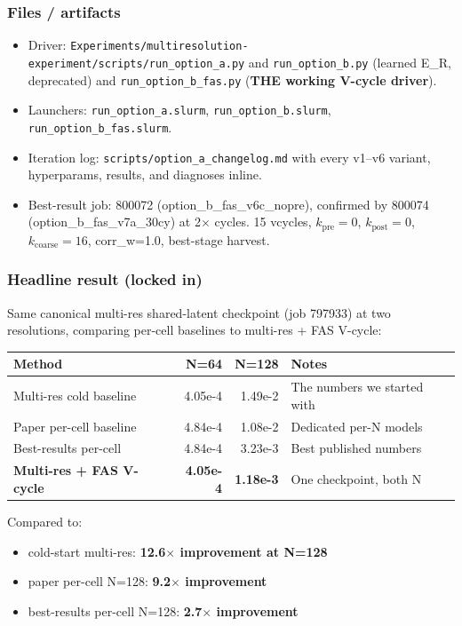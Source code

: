 \subsubsection*{Files / artifacts}
\begin{itemize}
  \item Driver: \texttt{Experiments/multiresolution-experiment/scripts/run\_option\_a.py}
        and \texttt{run\_option\_b.py} (learned E\_R, deprecated) and
        \texttt{run\_option\_b\_fas.py} (\textbf{THE working V-cycle driver}).
  \item Launchers: \texttt{run\_option\_a.slurm},
        \texttt{run\_option\_b.slurm}, \texttt{run\_option\_b\_fas.slurm}.
  \item Iteration log: \texttt{scripts/option\_a\_changelog.md} with every
        v1--v6 variant, hyperparams, results, and diagnoses inline.
  \item Best-result job: 800072 (option\_b\_fas\_v6c\_nopre), confirmed
        by 800074 (option\_b\_fas\_v7a\_30cy) at 2$\times$ cycles.
        15 vcycles, $k_{\text{pre}}=0$, $k_{\text{post}}=0$,
        $k_{\text{coarse}}=16$, corr\_w=1.0, best-stage harvest.
\end{itemize}

\subsubsection*{Headline result (locked in)}

Same canonical multi-res shared-latent checkpoint (job 797933) at two
resolutions, comparing per-cell baselines to multi-res + FAS V-cycle:

\begin{center}
\begin{tabular}{l r r l}
  \textbf{Method} & \textbf{N=64} & \textbf{N=128} & \textbf{Notes} \\
  \hline
  Multi-res cold baseline & 4.05e-4 & 1.49e-2 & The numbers we started with \\
  Paper per-cell baseline & 4.84e-4 & 1.08e-2 & Dedicated per-N models \\
  Best-results per-cell & 4.84e-4 & 3.23e-3 & Best published numbers \\
  \textbf{Multi-res + FAS V-cycle} & \textbf{4.05e-4} & \textbf{1.18e-3} & One checkpoint, both N \\
\end{tabular}
\end{center}

Compared to:
\begin{itemize}
  \item cold-start multi-res: \textbf{12.6$\times$ improvement at N=128}
  \item paper per-cell N=128: \textbf{9.2$\times$ improvement}
  \item best-results per-cell N=128: \textbf{2.7$\times$ improvement}
\end{itemize}

